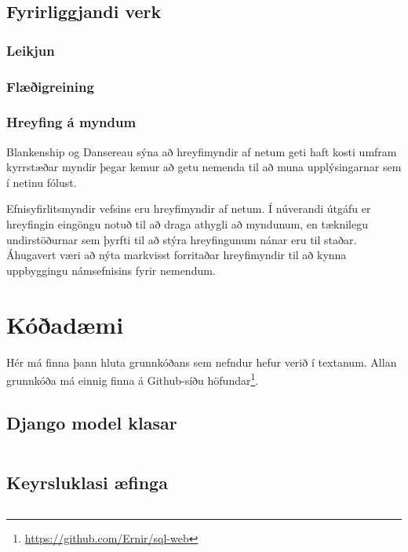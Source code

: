 \documentclass[a4paper,12pt,twoside,BCOR=10mm]{scrbook}
\begin{document}
\section{Fyrirliggjandi verk}
\subsection{Leikjun}
\subsection{Flæðigreining}
\subsection{Hreyfing á myndum}
Blankenship og Dansereau\cite{blankenship2000effect} sýna að hreyfimyndir af netum geti haft kosti umfram kyrrstæðar myndir þegar kemur að getu nemenda til að muna upplýsingarnar sem í netinu fólust.

Efnisyfirlitsmyndir vefsins eru hreyfimyndir af netum. Í núverandi útgáfu er hreyfingin eingöngu notuð til að draga athygli að myndunum, en tæknilegu undirstöðurnar sem þyrfti til að stýra hreyfingunum nánar eru til staðar. Áhugavert væri að nýta markvisst forritaðar hreyfimyndir til að kynna uppbyggingu námsefnisins fyrir nemendum.




\appendix
\renewcommand{\chaptername}{Appendix}
\chapter{Kóðadæmi}
Hér má finna þann hluta grunnkóðans sem nefndur hefur verið í textanum. Allan grunnkóða má einnig finna á Github-síðu höfundar\footnote{\url{https://github.com/Ernir/sql-web}}.
\section{Django model klasar}
\label{code:django-model-objects}
\inputminted[fontsize=\scriptsize, frame=lines, linenos=true, python3=true, label=models.py]{python}{../sql\string_web/models.py}
\section{Keyrsluklasi æfinga}
\label{code:example-runner}
\inputminted[fontsize=\scriptsize, frame=lines, linenos=true, python3=true, label=sql_runner.py]{python}{../sql\string_web/sql\string_runner.py}
\end{document}
